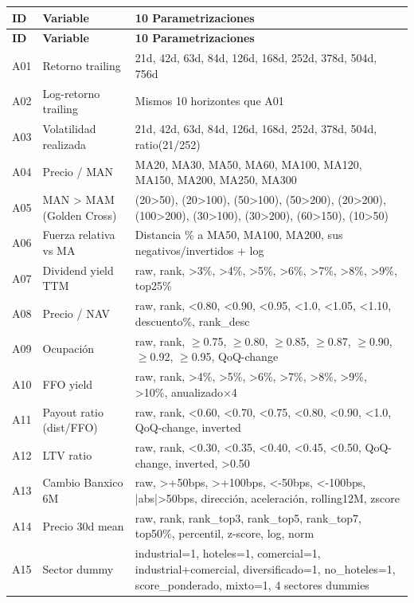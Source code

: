 \documentclass[12pt,letterpaper]{article}
\begin{document}
\begin{longtable}{p{0.8cm} p{4.5cm} p{9cm}}
\toprule
\textbf{ID} & \textbf{Variable} & \textbf{10 Parametrizaciones} \\
\midrule
\endfirsthead
\toprule
\textbf{ID} & \textbf{Variable} & \textbf{10 Parametrizaciones} \\
\midrule
\endhead
\bottomrule
\endfoot
A01 & Retorno trailing & 21d, 42d, 63d, 84d, 126d, 168d, 252d, 378d, 504d, 756d \\[3pt]
A02 & Log-retorno trailing & Mismos 10 horizontes que A01 \\[3pt]
A03 & Volatilidad realizada & 21d, 42d, 63d, 84d, 126d, 168d, 252d, 378d, 504d, ratio(21/252) \\[3pt]
A04 & Precio / MAN & MA20, MA30, MA50, MA60, MA100, MA120, MA150, MA200, MA250, MA300 \\[3pt]
A05 & MAN > MAM (Golden Cross) & (20>50), (20>100), (50>100), (50>200), (20>200), (100>200), (30>100), (30>200), (60>150), (10>50) \\[3pt]
A06 & Fuerza relativa vs MA & Distancia \% a MA50, MA100, MA200, sus negativos/invertidos + log \\[3pt]
A07 & Dividend yield TTM & raw, rank, >3\%, >4\%, >5\%, >6\%, >7\%, >8\%, >9\%, top25\% \\[3pt]
A08 & Precio / NAV & raw, rank, <0.80, <0.90, <0.95, <1.0, <1.05, <1.10, descuento\%, rank\_desc \\[3pt]
A09 & Ocupación & raw, rank, $\geq$0.75, $\geq$0.80, $\geq$0.85, $\geq$0.87, $\geq$0.90, $\geq$0.92, $\geq$0.95, QoQ-change \\[3pt]
A10 & FFO yield & raw, rank, >4\%, >5\%, >6\%, >7\%, >8\%, >9\%, >10\%, anualizado×4 \\[3pt]
A11 & Payout ratio (dist/FFO) & raw, rank, <0.60, <0.70, <0.75, <0.80, <0.90, <1.0, QoQ-change, inverted \\[3pt]
A12 & LTV ratio & raw, rank, <0.30, <0.35, <0.40, <0.45, <0.50, QoQ-change, inverted, >0.50 \\[3pt]
A13 & Cambio Banxico 6M & raw, >+50bps, >+100bps, <-50bps, <-100bps, |abs|>50bps, dirección, aceleración, rolling12M, zscore \\[3pt]
A14 & Precio 30d mean & raw, rank, rank\_top3, rank\_top5, rank\_top7, top50\%, percentil, z-score, log, norm \\[3pt]
A15 & Sector dummy & industrial=1, hoteles=1, comercial=1, industrial+comercial, diversificado=1, no\_hoteles=1, score\_ponderado, mixto=1, 4 sectores dummies \\
\end{longtable}
\end{document}
